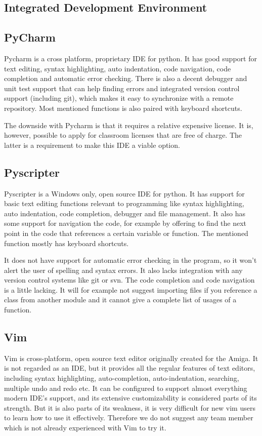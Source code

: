 \begin{description}
\section{Integrated Development Environment}

\subsection{PyCharm}
Pycharm is a cross platform, proprietary IDE for python. It has good support
for text editing, syntax highlighting, auto indentation, code navigation, code
completion and automatic error checking. There is also a decent debugger and
unit test support that can help finding errors and integrated version control
support (including git), which makes it easy to synchronize with a remote
repository. Most mentioned functions is also paired with keyboard shortcuts.

The downside with Pycharm is that it requires a relative expensive license. It
is, however, possible to apply for classroom licenses that are free of charge.
The latter is a requirement to make this IDE a viable option.

\subsection{Pyscripter}
Pyscripter is a Windows only, open source IDE for python. It has support for
basic text editing functions relevant to programming like syntax highlighting,
auto indentation, code completion, debugger and file management. It also has
some support for navigation the code, for example by offering to find the next
point in the code that references a certain variable or function. The mentioned
function mostly has keyboard shortcuts.

It does not have support for automatic error checking in the program, so it
won’t alert the user of spelling and syntax errors. It also lacks integration
with any version control systems like git or svn. The code completion and
code navigation is a little lacking. It will for example not suggest importing
files if you reference a class from another module and it cannot give a
complete list of usages of a function.

\subsection{Vim}
Vim is cross-platform, open source text editor originally created for the
Amiga. It is not regarded as an IDE, but it provides all the regular features
of text editors, including syntax highlighting, auto-completion,
auto-indentation, searching, multiple undo and redo etc. It can be configured
to support almost everything modern IDE’s support, and its extensive
customizability is considered parts of its strength. But it is also parts of
its weakness, it is very difficult for new vim users to learn how to use it
effectively. Therefore we do not suggest any team member which is not already
experienced with Vim to try it.


\end{description}

